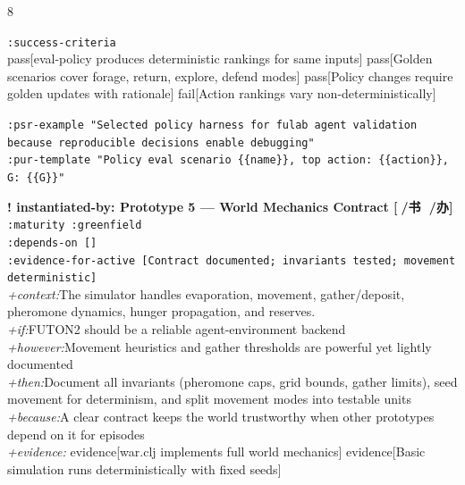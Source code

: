 \documentclass[landscape]{article}
\newcommand{\flexitag}[1]{\textcolor[gray]{0.35}{\textit{#1}}}
\newenvironment{devmapactive}{%
  \def\FrameCommand{\colorbox{devmapactivebg}}%
  \setlength{\fboxsep}{2pt}%
  \MakeFramed{\advance\hsize-\width \FrameRestore}%
}{\endMakeFramed}
\newenvironment{devmapgreenfield}{%
  \def\FrameCommand{\colorbox{devmapgreenfieldbg}}%
  \setlength{\fboxsep}{2pt}%
  \MakeFramed{\advance\hsize-\width \FrameRestore}%
}{\endMakeFramed}
\begin{document}
\begin{paracol}{8}
\begin{devmapactive}
\par
  \texttt{:\allowbreak{}success-\allowbreak{}criteria}\\
    pass[eval-policy produces deterministic rankings for same inputs] pass[Golden scenarios cover forage, return, explore, defend modes] pass[Policy changes require golden updates with rationale] fail[Action rankings vary non-deterministically]\\
\par
  \texttt{:\allowbreak{}psr-\allowbreak{}example "Selected policy harness for fulab agent validation because reproducible decisions enable debugging"}\\
  \texttt{:\allowbreak{}pur-\allowbreak{}template "Policy eval scenario \{\{name\}\},\allowbreak{} top action:\allowbreak{} \{\{action\}\},\allowbreak{} G:\allowbreak{} \{\{G\}\}"}\\
\par
\par
\end{devmapactive}
\begin{devmapgreenfield}
\textbf{! instantiated-by: Prototype 5 — World Mechanics Contract [🎑/书 👕/办]}\\
  \texttt{:\allowbreak{}maturity :\allowbreak{}greenfield}\\
  \texttt{:\allowbreak{}depends-\allowbreak{}on []}\\
  \texttt{:\allowbreak{}evidence-\allowbreak{}for-\allowbreak{}active [Contract documented;\allowbreak{} invariants tested;\allowbreak{} movement deterministic]}\\
  \flexitag{+context:}The simulator handles evaporation, movement, gather/deposit, pheromone dynamics, hunger propagation, and reserves.\\
  \flexitag{+if:}FUTON2 should be a reliable agent-environment backend\\
  \flexitag{+however:}Movement heuristics and gather thresholds are powerful yet lightly documented\\
  \flexitag{+then:}Document all invariants (pheromone caps, grid bounds, gather limits), seed movement for determinism, and split movement modes into testable units\\
  \flexitag{+because:}A clear contract keeps the world trustworthy when other prototypes depend on it for episodes\\
  \flexitag{+evidence:} evidence[war.clj implements full world mechanics] evidence[Basic simulation runs deterministically with fixed seeds]\\

\end{devmapgreenfield}
\end{paracol}
\end{document}
